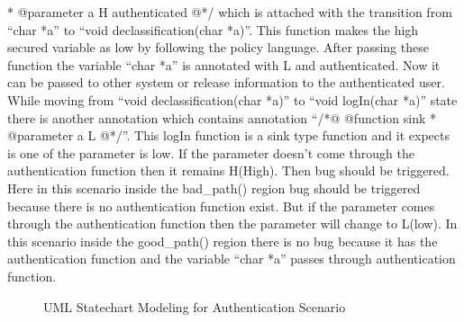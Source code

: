 {* @parameter a H authenticated @*/} which is attached with the transition from \enquote{char *a} to \enquote{void declassification(char *a)}. This function makes the high secured variable as low by following the policy language. After passing these function the variable \enquote{char *a} is annotated with L and authenticated. Now it can be passed to other system or release information to the authenticated user. While moving from \enquote{void declassification(char *a)} to \enquote{void logIn(char *a)} state there is another annotation which contains annotation \enquote{/*@ @function sink * @parameter a L @*/}. This logIn function is a sink type function and it expects is one of the parameter is low. If the parameter doesn't come through the authentication function then it remains H(High). Then bug should be triggered. Here in this scenario inside the bad\_path() region bug should be triggered because there is no authentication function exist. But if the parameter comes through the authentication function then the parameter will change to L(low). In this scenario inside the good\_path() region there is no bug because it has the authentication function and the variable \enquote{char *a} passes through authentication function.

\begin{figure}[htbp]
	\centering
	\label{authentication_scenario}
	\caption{UML Statechart Modeling for Authentication Scenario}
\end{figure}

